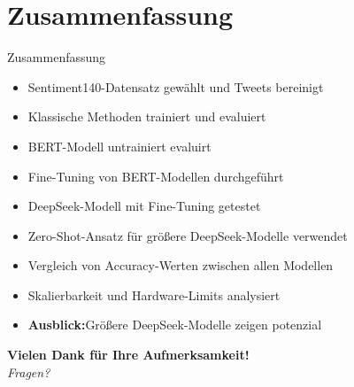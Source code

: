 \documentclass[aspectratio=169]{beamer} %
\begin{document}
\section{Zusammenfassung}

\begin{frame}{Zusammenfassung}
  \normalsize
  \begin{itemize}
      \item Sentiment140-Datensatz gewählt und Tweets bereinigt
      \item Klassische Methoden trainiert und evaluiert
      \item BERT-Modell untrainiert evaluirt
      \item Fine-Tuning von BERT-Modellen durchgeführt
      \item DeepSeek-Modell mit Fine-Tuning getestet
      \item Zero-Shot-Ansatz für größere DeepSeek-Modelle verwendet
      \item Vergleich von Accuracy-Werten zwischen allen Modellen
      \item Skalierbarkeit und Hardware-Limits analysiert
      \item \textbf{Ausblick:}Größere DeepSeek-Modelle zeigen potenzial
  \end{itemize}

  \vspace{0.5cm}
  \centering
  \pause
  {\large \textbf{Vielen Dank für Ihre Aufmerksamkeit!}} \\[0.1cm]
  \textit{Fragen?}
\end{frame}
\end{document}
